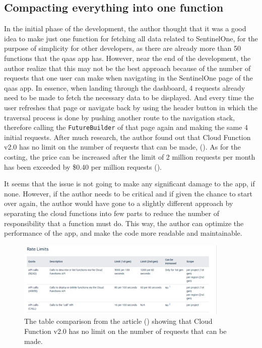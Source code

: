 \begin{multicols}{2}

  \subsection{Compacting everything into one function}

  In the initial phase of the development, the author thought that it was a good idea to make just one function for fetching all data
  related to SentinelOne, for the purpose of simplicity for other developers, as there are already more than 50 functions that the
  \acrshort{qaas} app has. However, near the end of the development, the author realize that this may not be the best approach because
  of the number of requests that one user can make when navigating in the SentinelOne page of the \acrshort{qaas} app. In essence,
  when landing through the dashboard, 4 requests already need to be made to fetch the necessary data to be displayed. And every time
  the user refreshes that page or navigate back by using the header button in which the traversal process is done by pushing another
  route to the navigation stack, therefore calling the \texttt{FutureBuilder} of that page again and making the same 4 initial requests.
  After much research, the author found out that Cloud Function v2.0 has no limit on the number of requests that can be made,
  (\textit{\cite{firebaseCloudFunctionLimit}}). As for the costing, the price can be increased after the limit of 2 million requests
  per month has been exceeded by \$0.40 per million requests (\textit{\cite{pricing}}).

  It seems that the issue is not going to make any significant damage to the app, if none. However, if the author needs to be
  critical and if given the chance to start over again, the author would have gone to a slightly different approach by separating
  the cloud functions into few parts to reduce the number of responsibility that a function must do. This way, the author can
  optimize the performance of the app, and make the code more readable and maintainable.

\end{multicols}
\begin{figure}[htbp]
  \centering
  \includegraphics[width=0.9\textwidth]{Figures/Cloud Function no limit.png}
  \caption{The table comparison from the article (\textit{\cite{firebaseCloudFunctionLimit}}) showing that Cloud Function v2.0 has no
    limit on the number of requests that can be made.}
\end{figure}

